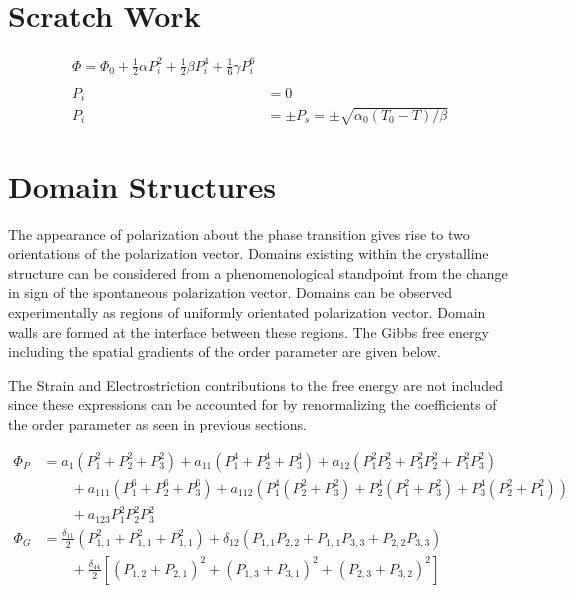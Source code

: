 \documentclass{article}
\begin{document}
\section{Scratch Work}
\begin{align}
\Phi=\Phi_0 + \frac{1}{2}\alpha P_i^2 + \frac{1}{2}\beta P_i^4 +\frac{1}{6} \gamma P_i^6 \\
\\
P_i &=0 \\
P_i &= \pm P_s = \pm \sqrt{\alpha_0(T_0 - T)/ \beta}
\end{align}

\newpage
\section{Domain Structures}
\justify

\indent           The appearance of polarization about the phase transition gives rise to two orientations of the polarization vector.  Domains existing within the crystalline structure can be considered from a phenomenological standpoint from the change in sign of the spontaneous polarization vector.  Domains can be observed experimentally as regions of uniformly orientated polarization vector.  Domain walls are formed at the interface between these regions.
The Gibbs free energy including the spatial gradients of the order parameter are given below.

The Strain and Electrostriction contributions to the free energy are not included since these expressions can be accounted for by renormalizing the coefficients of the order parameter as seen in previous sections.

\begin{align*}
\Phi_{P} &= a_1 \left(P_1^2+P_2^2+P_3^2\right)+a_{11} \left(P_1^4+P_2^4+P_3^4\right)+a_{12} \left(P_1^2 P_2^2+P_3^2 P_2^2+P_1^2 P_3^2\right) \\ 
& \qquad + a_{111} \left(P_1^6+P_2^6+P_3^6\right)+a_{112} \left( P_1^4\left(P_2^2+P_3^2\right)+P_2^4\left(P_1^2+P_3^2\right)+P_3^4 \left(P_2^2+P_1^2\right)\right) \nonumber \\ \nonumber & \qquad + a_{123} P_1^2 P_2^2 P_3^2 \\
 \Phi_{G} &= \frac{\delta_{11}}{2}(P_{1,1}^2+P_{1,1}^2+P_{1,1}^2)+\delta_{12}(P_{1,1} P_{2,2}+P_{1,1} P_{3,3}+ P_{2,2} P_{3,3}) \\
 & \qquad +\frac{\delta_{44}}{2}[(P_{1,2}+P_{2,1})^2+(P_{1,3}+P_{3,1})^2+(P_{2,3}+P_{3,2})^2]
\end{align*}
\end{document}

